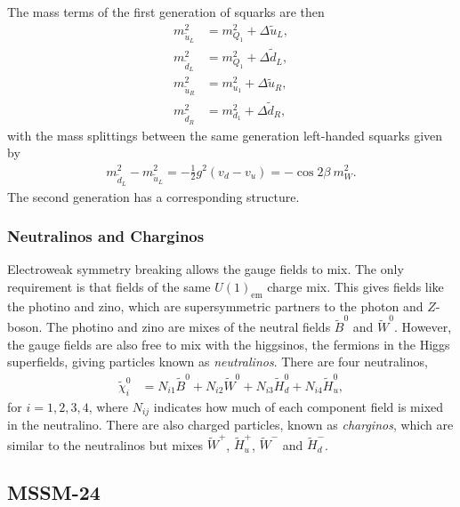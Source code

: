 \documentclass[twoside,english]{uiofysmaster}
\begin{document}
{The mass terms of the first generation of squarks are then  
\begin{align}
m_{\widetilde{u}_L}^2 &= m_{Q_1}^2 + \Delta \widetilde{u}_L,\\
m_{\widetilde{d}_L}^2 &= m_{Q_1}^2 + \Delta \widetilde{d}_L,\\
m_{\widetilde{u}_R}^2 &= m_{u_1}^2 + \Delta \widetilde{u}_R,\\
m_{\widetilde{d}_R}^2 &= m_{d_1}^2 + \Delta \widetilde{d}_R,
\end{align}
with the mass splittings between the same generation left-handed squarks given by
\begin{align}\label{Eq:: phys back : mass splitting dL uL}
m_{\widetilde{d}_L}^2 - m_{\widetilde{u}_L}^2 = - \frac{1}{2} g^2(v_d - v_u) = - \cos 2 \beta ~ m_W^2.
\end{align}
The second generation has a corresponding structure.


\subsubsection{Neutralinos and Charginos}

Electroweak symmetry breaking allows the gauge fields to mix. The only requirement is that fields of the same $U(1)_{\mathrm{em}}$ charge mix. This gives  fields like the photino and zino, which are supersymmetric partners to the photon and $Z$-boson. The photino and zino are mixes of the neutral fields $\widetilde{B}^0$ and $\widetilde{W}^0$. However, the gauge fields are also free to mix with the higgsinos, the fermions in the Higgs superfields, giving particles known as \textit{neutralinos}. There are four neutralinos,
\begin{align}
\widetilde{\chi}_i^0 &= N_{i1} \widetilde{B}^0 + N_{i2} \widetilde{W}^0 + N_{i3} \widetilde{H}_d^0 + N_{i4} \widetilde{H}_u^0,
\end{align}
for $i=1,2,3,4$, where $N_{ij}$ indicates how much of each component field is mixed in the neutralino. There are also charged particles, known as \textit{charginos}, which are similar to the neutralinos but mixes $\widetilde{W}^+$, $\widetilde{H}_u^+$, $\widetilde{W}^-$ and $\widetilde{H}_d^-$.

\subsection{MSSM-24}\label{Sec:: phys back : MSSM-24}

}
\end{document}
